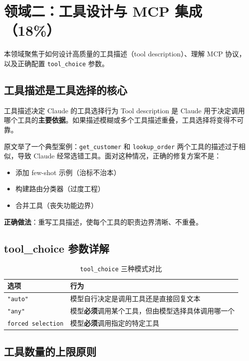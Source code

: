 \section{领域二：工具设计与 MCP 集成（18\%）}

本领域聚焦于如何设计高质量的工具描述（tool description）、理解 MCP 协议，以及正确配置 \texttt{tool\_choice} 参数。

\subsection{工具描述是工具选择的核心}

\begin{importantbox}{工具描述决定 Claude 的工具选择行为}
Tool description 是 Claude 用于决定调用哪个工具的\textbf{主要依据}。如果描述模糊或多个工具描述重叠，工具选择将变得不可靠。
\end{importantbox}

原文举了一个典型案例：\texttt{get\_customer} 和 \texttt{lookup\_order} 两个工具的描述过于相似，导致 Claude 经常选错工具。面对这种情况，正确的修复方案不是：
\begin{itemize}[leftmargin=1.5em]
    \item 添加 few-shot 示例（治标不治本）
    \item 构建路由分类器（过度工程）
    \item 合并工具（丧失功能边界）
\end{itemize}
\textbf{正确做法}：重写工具描述，使每个工具的职责边界清晰、不重叠。

\subsection{tool\_choice 参数详解}

\begin{table}[H]
\centering
\begin{tabular}{lp{9cm}}
\toprule
\textbf{选项} & \textbf{行为} \\
\midrule
\texttt{"auto"} & 模型自行决定是调用工具还是直接回复文本 \\
\texttt{"any"} & 模型\textbf{必须}调用某个工具，但由模型选择具体调用哪一个 \\
\texttt{forced selection} & 模型\textbf{必须}调用指定的特定工具 \\
\bottomrule
\end{tabular}
\caption{\texttt{tool\_choice} 三种模式对比}
\end{table}

\subsection{工具数量的上限原则}

